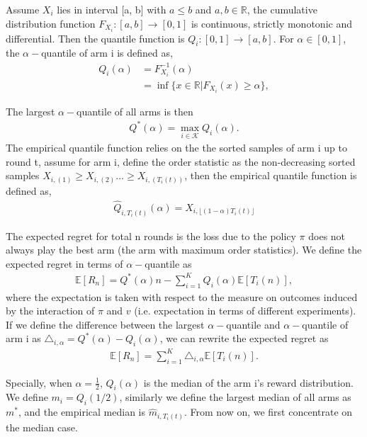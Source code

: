 \documentclass{article}
\theoremstyle{plain}
\begin{document}
    Assume $X_i$ lies in interval [a, b] with $a \leq b$ and $a, b \in \mathbb{R}$, the cumulative distribution function $F_{X_i}: [a, b] \rightarrow [0,1]$ is continuous, strictly monotonic and differential. Then the quantile function is $Q_{i}:  [0,1] \rightarrow [a,b]$. For $\alpha \in [0,1]$, the $\alpha-$quantile of arm i is defined as,
    \begin{align}
        Q_{i}(\alpha) &= F_{X_i}^{-1}(\alpha)\\
        &= \inf \{x \in \mathbb{R}| F_{X_i}(x) \geq \alpha\},
    \end{align}

The largest $\alpha-$quantile of all arms is then 
\begin{align}
    Q^\ast(\alpha) = \max_{i\in \mathcal{K}} Q_{i}(\alpha).
\end{align}
The empirical quantile function relies on the the sorted samples of arm i up to round t, assume for arm i, define the order statistic as the non-decreasing sorted samples $X_{i,(1)} \geq X_{i,(2)} ... \geq X_{i,(T_i(t))}$, then the empirical quantile function is defined as,
\begin{align}
    \hat{Q}_{i, T_i(t)}(\alpha) = X_{i,\lfloor (1 - \alpha) T_i(t) \rfloor}
\end{align}


The expected regret for total n rounds is the loss due to the policy $\pi$ does not always play the best arm (the arm with maximum order statistics). We define the expected regret in terms of $\alpha-$quantile as 
\begin{align}
    \label{regret}
    \mathbb{E}[R_n] = Q^\ast(\alpha) n -  \sum_{i=1}^K Q_{i}(\alpha) \mathbb{E}[T_i(n)],
\end{align}
where the expectation is taken with respect to the measure on outcomes induced by the interaction of $\pi$ and $v$ (i.e. expectation in terms of different experiments). If we define the difference between the largest $\alpha-$quantile and $\alpha-$quantile of arm i as $\triangle_{i,\alpha} = Q^\ast(\alpha) - Q_{i}(\alpha)$, we can rewrite the expected regret as
\begin{align}
    \label{defi: expected regret}
    \mathbb{E}[R_n] = \sum_{i = 1}^K \triangle_{i, \alpha} \mathbb{E}[T_i(n)].
\end{align}

Specially, when $\alpha = \frac{1}{2}$, $Q_i(\alpha)$ is the median of the arm i's reward distribution. We define $m_i = Q_i(1/2)$, similarly we define the largest median of all arms as $m^*$, and the empirical median is $\hat{m}_{i, T_i(t)}$. From now on, we first concentrate on the median case. 
\end{document}
